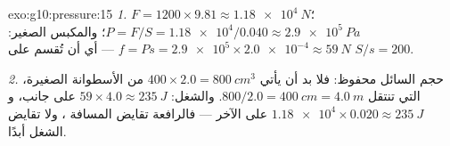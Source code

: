 \begin{solution}{exo:g10:pressure:15}
\emph{1.}  $F = 1200 \times 9.81 \approx \qty{1.18e4}{N}$؛
 $P = F/S = \num{1.18e4}/0.040 \approx \qty{2.9e5}{Pa}$؛ والمكبس
الصغير: $f = P s = \num{2.9e5} \times \num{2.0e-4} \approx \qty{59}{N}$
--- أي أن  تُقسم على $S/s = 200$.

\emph{2.} حجم السائل محفوظ:
فلا بد أن يأتي $400 \times 2.0 = \qty{800}{cm^3}$ من الأسطوانة الصغيرة،
التي تنتقل $800/2.0 = \qty{400}{cm} = \qty{4.0}{m}$. والشغل:
$59 \times 4.0 \approx \qty{235}{J}$ على جانب،
و$\num{1.18e4} \times 0.020 \approx \qty{235}{J}$ على الآخر --- فالرافعة
تقايض المسافة ، ولا تقايض الشغل أبدًا.
\end{solution}

